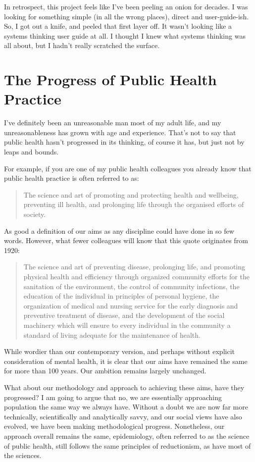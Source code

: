 In retrospect, this project feels like I've been peeling an onion for decades. I was looking for something simple (in all the wrong places), direct and user-guide-ish. So, I got out a knife, and peeled that first layer off. It wasn't looking like a systems thinking user guide at all. I thought I knew what systems thinking was all about, but I hadn't really scratched the surface.

\section{The Progress of Public Health Practice}
I've definitely been an unreasonable man most of my adult life, and my unreasonableness has grown with age and experience. That's not to say that public health hasn't progressed in its thinking, of course it has, but just not by leaps and bounds.

For example, if you are one of my public health colleagues you already know that public health practice is often referred to as: \begin{quote}
	The science and art of promoting and protecting health and wellbeing, preventing ill health, and prolonging life through the organised efforts of society.
\end{quote}
As good a definition of our aims as any discipline could have done in so few words. However, what fewer colleagues will know that this quote originates from 1920: 
\begin{quote}
	The science and art of preventing disease, prolonging life, and promoting physical health and efficiency through organized community efforts for the sanitation of the environment, the control of community infections, the education of the individual in principles of personal hygiene, the organization of medical and nursing service for the early diagnosis and preventive treatment of disease, and the development of the social machinery which will ensure to every individual in the community a standard of living adequate for the maintenance of health.
\end{quote}
While wordier than our contemporary version, and perhaps without explicit consideration of mental health, it is clear that our aims have remained the same for more than 100 years. Our ambition  remains largely unchanged.

What about our methodology and approach to achieving these aims, have they progressed? I am going to argue that no, we are essentially approaching population the same way we always have. Without a doubt we are now far more technically, scientifically and analytically savvy, and our social views have also evolved, we have been making methodological progress. Nonetheless, our approach overall remains the same, epidemiology, often referred to as the science of public health, still follows the same principles of reductionism, as have most of the sciences.

